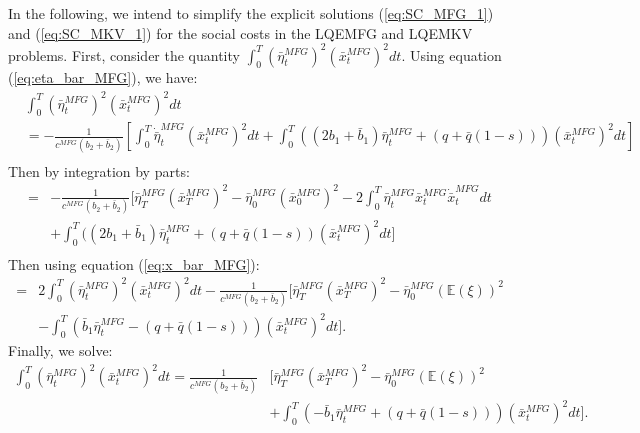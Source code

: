 \documentclass[11pt]{article}
\begin{document}
In the following, we intend to simplify the explicit solutions (\ref{eq:SC_MFG_1}) and (\ref{eq:SC_MKV_1}) for the social costs in the LQEMFG and LQEMKV problems. First, consider the quantity $\int_0^T (\bar{\eta}^{MFG}_t)^2 (\bar{x}^{MFG}_t)^2 dt$. Using equation (\ref{eq:eta_bar_MFG}), we have:
\begin{equation*}
\begin{split}
&\int_0^T (\bar{\eta}^{MFG}_t)^2 (\bar{x}^{MFG}_t)^2 dt\\
&= - \frac{1}{c^{MFG}(b_2 + \bar{b}_2)} \left[ \int_0^T \dot{\bar{\eta}}^{MFG}_t (\bar{x}^{MFG}_t)^2 dt +  \int_0^T ((2b_1 + \bar{b}_1) \bar{\eta}^{MFG}_t +(q+\bar{q}(1-s))) (\bar{x}^{MFG}_t)^2 dt \right]\\
\end{split}
\end{equation*}
Then by integration by parts:
\begin{equation*}
\begin{split}
= & - \frac{1}{c^{MFG}(b_2 + \bar{b}_2)} \Bigg[ \bar{\eta}^{MFG}_T(\bar{x}^{MFG}_T)^2-\bar{\eta}^{MFG}_0(\bar{x}^{MFG}_0)^2-2\int_0^T\bar{\eta}^{MFG}_t\bar{x}^{MFG}_t\dot{\bar{x}}^{MFG}_t dt \\
& + \int_0^T ( (2b_1 + \bar{b}_1) \bar{\eta}^{MFG}_t +(q+\bar{q}(1-s)) (\bar{x}^{MFG}_t)^2 dt \Bigg] \\
\end{split}
\end{equation*}
Then using equation (\ref{eq:x_bar_MFG}):
\begin{equation*}
\begin{split}
= & 2 \int_0^T (\bar{\eta}^{MFG}_t)^2 (\bar{x}^{MFG}_t)^2dt  - \frac{1}{c^{MFG}(b_2 + \bar{b}_2)} \Bigg[ \bar{\eta}^{MFG}_T (\bar{x}^{MFG}_T)^2 - \bar{\eta}^{MFG}_0 (\mathbb{E}(\xi))^2 \\
&- \int_0^T  (\bar{b}_1 \bar{\eta}^{MFG}_t -(q+\bar{q}(1-s))) (\bar{x}^{MFG}_t)^2 dt \Bigg].
\end{split}
\end{equation*}
Finally, we solve:
\begin{equation*}
\begin{split}
\int_0^T (\bar{\eta}^{MFG}_t)^2 (\bar{x}^{MFG}_t)^2 dt= \frac{1}{c^{MFG}(b_2 + \bar{b}_2)} &\Bigg[ \bar{\eta}^{MFG}_T (\bar{x}^{MFG}_T)^2 - \bar{\eta}^{MFG}_0 (\mathbb{E}(\xi))^2 \\
&+ \int_0^T  (-\bar{b}_1 \bar{\eta}^{MFG}_t+(q+\bar{q}(1-s))) (\bar{x}^{MFG}_t)^2 dt \Bigg].
\end{split}
\end{equation*}
\end{document}
